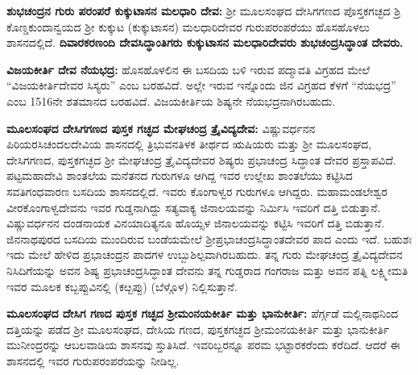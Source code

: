 \textbf{ಶುಭಚಂದ್ರನ ಗುರು ಪರಂಪರೆ \general{\enginline{-}} ಕುಕ್ಕುಟಾಸನ ಮಲಧಾರಿ ದೇವ:} ಶ‍್ರೀ ಮೂಲಸಂಘದ ದೇಸಿಗಗಣದ ಪೊಸ್ತಕಗಚ್ಛದ ಶ್ರಿ ಕೊಣ್ಡಕುಂದಾನ್ವಯದ ಶ‍್ರೀ ಕುಕ್ಕುಟ (ಕುಕ್ಕುಟಾಸನ) ಮಲಧಾರಿದೇವರ ಗುರುಪರಂಪರೆಯು ಹೊಸಹೊಳಲು ಶಾಸನ\-ದಲ್ಲಿದೆ.\textbf{ ದಿವಾರಕರಣಂದಿ ದೇವಸಿದ್ಧಾಂತಿಗರು \general{\enginline{-}} ಕುಕ್ಕುಟಾಸನ ಮಲಧಾರಿದೇವರು \general{\enginline{-}} ಶುಭಚಂದ್ರಸಿದ್ಧಾಂತ ದೇವರು.}

\textbf{ವಿಜಯಕೀರ್ತಿ ದೇವ\general{\enginline{-}} ನೆಯಭದ್ರ:} ಹೊಸಹೊಳಲಿನ ಈ ಬಸದಿಯ ಬಳಿ ಇರುವ ಪದ್ಮಾವತಿ ವಿಗ್ರಹದ ಮೇಲೆ “ವಿಜಯಕೀರ್ತಿದೇವರ ಸಿಸ್ಯರು” ಎಂಬ ಬರಹವಿದೆ. ಅಲ್ಲೇ ಇರುವ ಇನ್ನೊಂದು ಜಿನ ವಿಗ್ರಹದ ಕೆಳಗೆ “ನೆಯಭದ್ರ” ಎಂಬ 15\enginline{-}16ನೇ ಶತಮಾನದ ಬರಹವಿದೆ. ವಿಜಯಕೀರ್ತಿಯ ಶಿಷ್ಯನೇ ನೆಯಭದ್ರನಾಗಿರಬಹುದು.

\textbf{ಮೂಲಸಂಘದ ದೇಸಿಗಗಣದ ಪುಸ್ತಕ ಗಚ್ಛದ ಮೇಘಚಂದ್ರ ತ್ರೈವಿದ್ಯದೇವ:} ವಿಷ್ಣುವರ್ಧನನ ಪಿರಿಯರಸಿ\break ಚಂದಲದೇವಿಯ ಶಾಸನದಲ್ಲಿ ತ್ರಿಭುವನತಿಳಕ ತೀರ್ಥದ ಋಷಿಯರು ಮತ್ತು ಶ‍್ರೀ ಮೂಲಸಂಘದ, ದೇಸಿಗಗಣದ, ಪುಸ್ತಕಗಚ್ಛದ ಶ‍್ರೀ ಮೇಘಚಂದ್ರ ತ್ರೈವಿದ್ಯದೇವರ ಶಿಷ್ಯರು ಪ್ರಭಾಚಂದ್ರ ಸಿದ್ಧಾಂತ ದೇವರ ಪ್ರಸ್ತಾಪವಿದೆ. ಪಟ್ಟಮಹಾದೇವಿ ಶಾಂತಲೆಯ ಮನೆತನದ ಗುರುಗಳೂ ಆಗಿದ್ದ ಇವರ ಉಲ್ಲೇಖ ಶಾಂತಲೆಯು ಕಟ್ಟಿಸಿದ ಸವತಿಗಂಧವಾರಣ ಬಸದಿಯ ಶಾಸನದಲ್ಲಿದೆ. ಇವರು ಕೊಂಗಾಳ್ವರ ಗುರುಗಳೂ ಆಗಿದ್ದರು. ಮಹಾಮಂಡಲೇಶ್ವರ ವೀರಕೊಂಗಾಳ್ವದೇವನು ಇವರ ಗುಡ್ಡನಾಗಿದ್ದು ಸತ್ಯವಾಕ್ಯ ಜಿನಾಲಯವನ್ನು ನಿರ್ಮಿಸಿ ಇವರಿಗೆ ದತ್ತಿ ಬಿಡುತ್ತಾನೆ. ವಿಷ್ಣುವರ್ಧನನ ದಂಡನಾಯಕ ವಿನಯಾದಿತ್ಯನೂ ಹೊಯ್ಸಳ ಜಿನಾಲಯವನ್ನು ಕಟ್ಟಿಸಿ ಇವರಿಗೆ ದತ್ತಿ ಬಿಡುತ್ತಾನೆ. ಜಿನನಾಥಪುರದ ಬಸದಿಯ ಮುಂದಿರುವ ಬಂಡೆಯಮೇಲೆ ಶ‍್ರೀಪ್ರಭಾಚಂದ್ರಸಿದ್ಧಾಂತದೇವರ ಪಾದ ಎಂದು ಇದೆ. ಬಹುಶಃ ಇದು ಮೇಲೆ ಹೇಳಿದ ಪ್ರಭಾಚಂದ್ರನ ಪಾದಗಳ ಉಬ್ಬುಶಿಲ್ಪವಾಗಿರಬಹುದು. ತನ್ನ ಗುರು ಮೇಘಚಂದ್ರ ತ್ರೈವಿದ್ಯದೇವನ ನಿಸಿದಿಗೆಯನ್ನು ಅವನ ಶಿಷ್ಯ ಪ್ರಭಾಚಂದ್ರಸಿದ್ಧಾಂತ ದೇವನು ತನ್ನ ಗುಡ್ಡರಾದ ಗಂಗರಾಜ ಮತ್ತು ಅವನ ಪತ್ನಿ ಲಕ್ಷ್ಮೀಮತಿ ಇವರ ಮೂಲಕ ಕಬ್ಬಪ್ಪುವಿನಲ್ಲಿ (ಕೞ್ಬಪ್ಪು) (ಬೆಳ್ಗೊಳ) ನಿಲ್ಲಿಸುತ್ತಾನೆ.

\vskip 3pt

\textbf{ಮೂಲಸಂಘದ ದೇಸಿಗ ಗಣದ ಪುಸ್ತಕ ಗಚ್ಛದ ಶ‍್ರೀಮಂನಯಕೀರ್ತಿ ಮತ್ತು ಭಾನುಕೀರ್ತಿ:} ಪೆರ್ಗ್ಗಡೆ ಮಲ್ಲಿನಾಥನಿಂದ ದತ್ತಿಯನ್ನು ಪಡೆದ ಶ‍್ರೀ ಮೂಲಸಂಘದ, ದೇಸಿಯ ಗಣದ, ಪುಸ್ತಕಗಚ್ಛದ ಶ‍್ರೀಮಂನಯಕೀರ್ತಿ ಮತ್ತು ಭಾನುಕೀರ್ತಿ ಮುನೀಂದ್ರರನ್ನು ಆಬಲವಾಡಿಯ ಶಾಸನವು ಸ್ತುತಿಸಿದೆ. ಇವರಿಬ್ಬರನ್ನೂ ಪರಮ ಭಟ್ಟಾರಕರೆಂದು ಕರೆದಿದೆ. ಆದರೆ ಈ ಶಾಸನದಲ್ಲಿ ಇವರ ಗುರುಪರಂಪರೆಯನ್ನು ನೀಡಿಲ್ಲ.

